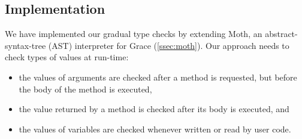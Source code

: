 
\subsection{Implementation} 
\label{ssec:implementation} 


We have implemented our gradual type checks 
by extending Moth, 
an abstract-syntax-tree (AST) interpreter for
Grace (\cref{ssec:moth}).
%
%
%
%
Our approach needs to check types of values at run-time:

\begin{itemize}
\item the values of arguments are checked after a method is requested, 
      but before the body of the method is executed,
\item the value returned by a method is checked after its body is executed, and
\item the values of variables are checked
      whenever written or read by user code.
\end{itemize}

